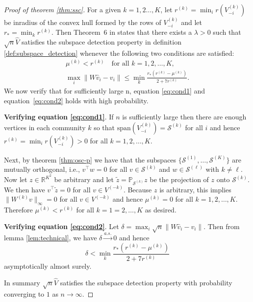 \documentclass[
  12pt,
]{article}
\theoremstyle{definition}
\theoremstyle{definition}
\theoremstyle{definition}
\theoremstyle{definition}
\theoremstyle{remark}
\begin{document}
\begin{proof}[Proof of theorem \ref{thm:ssc}]
For a given $k = 1,2\dots,K$, let $r^{(k)} = \min_{i}r(V_{-i}^{(k)})$ be inradius of the convex hull formed by
the rows of $V_{-i}^{(k)}$ and let $r_* = \min_{k} r^{(k)}$. Then Theorem~6 in
\citet{jmlr-v28-wang13} states that there exists a $\lambda > 0$
such that $\sqrt{n} \hat{V}$ satisfies the subspace detection property in definition \ref{def:subspace_detection} whenever the following two conditions are satisfied: 
\begin{gather}
\label{eq:cond1}
\mu^{(k)} < r^{(k)} \quad \text{for all $k = 1,2,\dots,K$}, \\
\label{eq:cond2}
\max_{i} \|W \hat{v}_{i} - v_{i}\| \leq \min_{k} \frac{r_*(r^{(k)} -
\mu^{(k)})}{2 + 7 r^{(k)}}.
\end{gather}
We now verify that for sufficiently large n, equation \eqref{eq:cond1} and equation~\eqref{eq:cond2}
holds with high probability.

{\bf Verifying equation \eqref{eq:cond1}}. If $n$ is sufficiently large then
there are enough vertices in each community $k$ so that
$\mathrm{span}(V_{-i}^{(k)}) = \mathcal{S}^{(k)}$ for all $i$ and hence
\(r^{(k)} = \min_{i} r(V_{-i}^{(k)}) > 0\) for
all $k = 1,2,\dots,K$. 

Next, by theorem \ref{thm:osc-p} we have that the subspaces
$\{\mathcal{S}^{(1)}, \dots, \mathcal{S}^{(K)}\}$
are mutually orthogonal, i.e., $v^{\top} w = 0$ for all $v \in
\mathcal{S}^{(k)}$ and $w \in \mathcal{S}^{(\ell)}$ with $k \not =
\ell$. Now let $z \in \mathbb{R}^{K^2}$ be arbitrary and let
$\tilde{z} = \mathbb{P}_{\mathcal{S}^{(k)}} z$ be the projection of
$z$ onto $\mathcal{S}^{(k)}$. We then have $v^{\top} \tilde{z} =
0$ for all $v \in V^{(-k)}$. Because $z$ is arbitrary, this implies 
$\|W^{(k)} v\|_{\infty} = 0$ for all $v
\in V^{(-k)}$ and hence $\mu^{(k)} = 0$ for all $k
=1,2,\dots,K$. Therefore $\mu^{(k)} < r^{(k)}$ for all $k =
1=2,\dots,K$ as desired.

{\bf Verifying equation \eqref{eq:cond2}}.
Let $\delta = \max_{i} \sqrt{n} \|W \hat{v}_{i} - v_{i}\|$. 
Then from lemma \ref{lem:technical}, we have \(\delta \stackrel{a.s.}{\to} 0\) and hence
$$\delta < \min_{k} \frac{r_* (r^{(k)} - \mu^{(k)})}{2 + 7 r^{(k)}}$$
asymptotically almost surely. 

In summary $\sqrt{n} \hat{V}$ satisfies the subspace detection property with probability converging to $1$ as \(n \to \infty\).
\end{proof}
\end{document}
